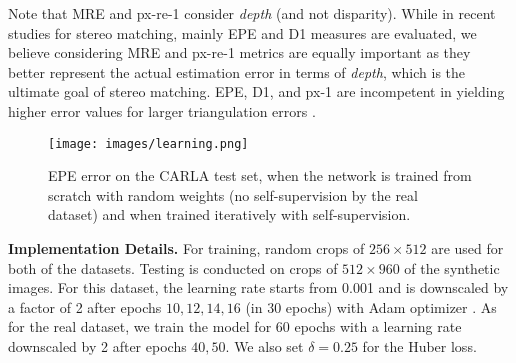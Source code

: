 \documentclass[10pt,twocolumn,letterpaper]{article}
\begin{document}
Note that MRE and px-re-1 consider \emph{depth} (and not disparity). While in recent studies for stereo matching, mainly EPE and D1 measures are evaluated, we believe considering MRE and px-re-1 metrics are equally important as they better represent the actual estimation error in terms of \emph{depth}, which is the ultimate goal of stereo matching. EPE, D1, and px-1 are incompetent in yielding higher error values for larger triangulation errors \cite{van2006real}. 
\begin{figure}[t]
	\begin{center}
		\texttt{[image: images/learning.png]}
	\end{center}
	\vspace{-0.8cm}
	\caption{EPE error on the CARLA test set, when the network is trained from scratch with random weights (no self-supervision by the real dataset) and when trained iteratively with self-supervision.}
	\label{fig:learning}
\end{figure} 
\noindent\textbf{Implementation Details.} For training, random crops of $256\times512$ are used for both of the datasets. Testing is conducted on crops of $512\times960$ of the synthetic images. For this dataset, the learning rate starts from 0.001 and is downscaled by a factor of 2 after epochs $10,12,14,16$ (in 30 epochs) with Adam optimizer \cite{kingma2014adam}. As for the real dataset, we train the model for 60 epochs with a learning rate downscaled by 2 after epochs $40,50$. We also set $\delta=0.25$ for the Huber loss.
\end{document}

